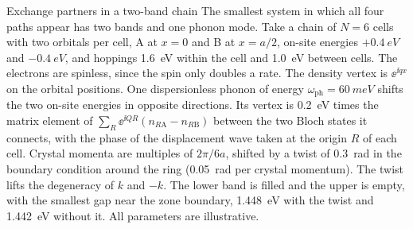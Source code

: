 \begin{workedexample}{Exchange partners in a two-band chain}\label{we:13-exchange}
The smallest system in which all four paths appear has two bands and one phonon mode. Take a chain of $N = 6$ cells with two orbitals per cell, A at $x = 0$ and B at $x = a/2$, on-site energies $+\SI{0.4}{eV}$ and $-\SI{0.4}{eV}$, and hoppings \SI{1.6}{eV} within the cell and \SI{1.0}{eV} between cells. The electrons are spinless, since the spin only doubles a rate. The density vertex is $\ee^{\ii qx}$ on the orbital positions. One dispersionless phonon of energy $\omega_{\mathrm{ph}} = \SI{60}{meV}$ shifts the two on-site energies in opposite directions. Its vertex is \SI{0.2}{eV} times the matrix element of $\sum_R\ee^{\ii QR}(n_{R\mathrm{A}} - n_{R\mathrm{B}})$ between the two Bloch states it connects, with the phase of the displacement wave taken at the origin $R$ of each cell. Crystal momenta are multiples of $2\pi/6a$, shifted by a twist of \SI{0.3}{rad} in the boundary condition around the ring (\SI{0.05}{rad} per crystal momentum). The twist lifts the degeneracy of $k$ and $-k$. The lower band is filled and the upper is empty, with the smallest gap near the zone boundary, \SI{1.448}{eV} with the twist and \SI{1.442}{eV} without it. All parameters are illustrative.


\end{workedexample}
